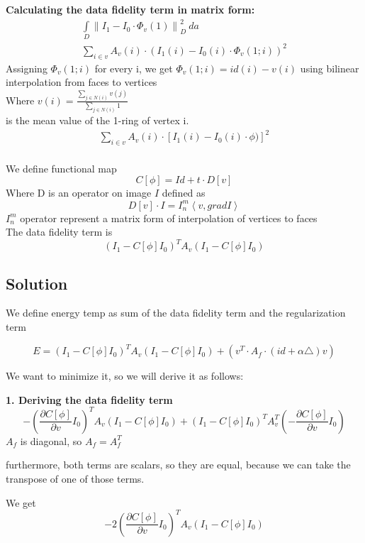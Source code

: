 \documentclass[12pt]{article}
\begin{document}
\textbf{Calculating the data fidelity term in matrix form:}
\begin{eqnarray}
\int \limits_D {\|I_1 - I_0 \cdot \Phi _v(1) \|}^2_D \ da \\
\sum \limits_{i \in v} A_v(i) \cdot {\left(I_1(i) - I_0(i) \cdot \Phi _v(1;i) \right)}^2
\end{eqnarray}
Assigning $ \Phi _v(1;i) $ for every i, we get $ \Phi _v(1;i) = id(i) - v(i) $
using bilinear interpolation from faces to vertices \\
Where $ \displaystyle{v(i) = \frac{\sum \limits_{j \in N(i)} v(j)}{\sum \limits_{j \in N(i)} 1}} $  \\
is the mean value of the 1-ring of vertex i.
\begin{eqnarray}
\sum \limits_{i \in v} A_v(i) \cdot {\left[I_1(i) - I_0(i) \cdot \phi) \right]}^2 \\
\end{eqnarray}

We define functional map
$$ C[\phi] = Id + t \cdot D[v] $$
Where D is an operator on image $I$ defined as
$$ D[v] \cdot I = I_n^m \left\langle v , grad I \right \rangle $$
$I_n^m$ operator represent a matrix form of interpolation of vertices to faces
\\

The data fidelity term is
$$ (I_1 - C[\phi] I_0)^T A_v (I_1 - C[\phi] I_0)$$


\newpage
\subsection{Solution}
We define energy temp as sum of the data fidelity term and the regularization term

$$ E = (I_1 - C[\phi] I_0)^T A_v (I_1 - C[\phi] I_0) + (v^T \cdot A_f \cdot (id + \alpha \triangle) v) $$

We want to minimize it, so we will derive it as follows:

\textbf{1. Deriving the data fidelity term}
$$ - \left(  \frac{\partial C[\phi]}{\partial v} I_0  \right) ^T A_v (I_1 - C[\phi] I_0) +
(I_1 - C[\phi] I_0)^T A_v^T \left( - \frac{\partial C[\phi]}{\partial v} I_0  \right)
$$
$A_f$ is diagonal, so $A_f = A_f^T$

furthermore, both terms are scalars, so they are equal, because we can take the transpose of one of those terms.

We get
$$ -2 \left(  \frac{\partial C[\phi]}{\partial v} I_0  \right) ^T A_v (I_1 - C[\phi] I_0) $$
\end{document}

